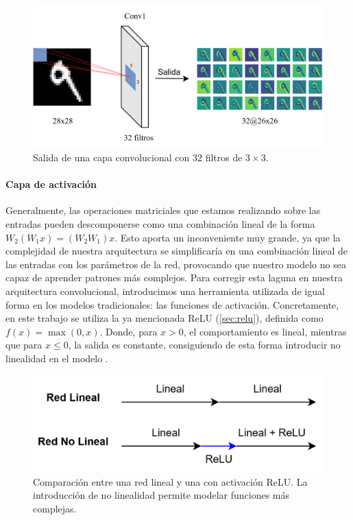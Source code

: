 \begin{figure}[ht]
	\centering
	\includegraphics[width=1\linewidth]{figures/ejemplos/conv1_salidas.png}
	\caption{Salida de una capa convolucional con $32$ filtros de $3\times3$.}
	\label{fig:conv1_salidas}
\end{figure}


\paragraph{Capa de activación}

Generalmente, las operaciones matriciales que estamos realizando sobre las entradas pueden descomponerse como una combinación lineal de la forma $W_2(W_1x)=(W_2W_1)x$. Esto aporta un inconveniente muy grande, ya que la complejidad de nuestra arquitectura se simplificaría en una combinación lineal de las entradas con los parámetros de la red, provocando que nuestro modelo no sea capaz de aprender patrones más complejos. Para corregir esta laguna en nuestra arquitectura convolucional, introducimos una herramienta utilizada de igual forma en los modelos tradicionales: las funciones de activación. Concretamente, en este trabajo se utiliza la ya mencionada ReLU (\ref{sec:relu}), definida como $f(x) = \max(0, x)$. Donde, para $x > 0$, el comportamiento es lineal, mientras que para $x \le 0$, la salida es constante, consiguiendo de esta forma introducir no linealidad en el modelo \cite{dl_fundamentos__casas_roma_2020, dl__goodfellow_2016}.

\begin{figure}[h]
	\centering
	\includegraphics[width=0.6\linewidth]{figures/ejemplos/no_linealidad_relu.png}
	\caption{Comparación entre una red lineal y una con activación ReLU. La introducción de no linealidad permite modelar funciones más complejas.}
	\label{fig:relu_network}
\end{figure}


